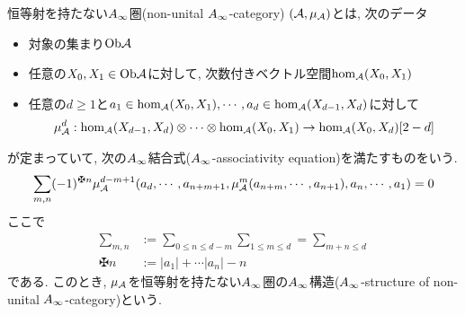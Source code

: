 \documentclass[uplatex, a4paper, 14Q, dvipdfmx]{jsarticle}
\begin{document}
\begin{definition} \label{def_non_unital_Ainf_cat}
  恒等射を持たない$A_{\infty}$圏(non-unital $A_{\infty}$-category) $(\mathcal{A},\mu_{\mathcal{A}})$とは, 次のデータ
  \begin{itemize}
    \item 対象の集まり$\mathrm{Ob}\mathcal{A}$ 
    \item 任意の$X_0, X_1 \in \mathrm{Ob}\mathcal{A}$に対して, 次数付きベクトル空間$\hom_{\mathcal{A}}(X_0,X_1)$
    \item 任意の$d \geq 1$と$a_1 \in \hom_{\mathcal{A}}(X_0,X_1), \cdots, a_d \in \hom_{\mathcal{A}}(X_{d-1},X_d)$に対して
    \begin{align*}
      \mu^d_{\mathcal{A}} : \hom_{\mathcal{A}}(X_{d-1},X_d) \otimes \cdots \otimes \hom_{\mathcal{A}}(X_0,X_1) \to \hom_{\mathcal{A}}(X_0,X_d)[2-d]
    \end{align*}
  \end{itemize}
  が定まっていて, 次の$A_{\infty}$結合式($A_{\infty}$-associativity equation)を満たすものをいう. 
  \begin{align*}
    \sum_{m,n} (-1)^{\maltese n} \mu^{d-m+1}_\A(a_d,\cdots,a_{n+m+1}, \mu^m_\A(a_{n+m},\cdots,a_{n+1}), a_n,\cdots,a_1)
    = 0
  \end{align*}
  ここで
  \begin{align*}
    \sum_{m,n} &:= \sum_{0 \leq n \leq d-m} \sum_{1 \leq m \leq d} = \sum_{m+n \leq d} \\
    \maltese n &:= |a_1| + \cdots |a_n| - n
  \end{align*}
  である. 
  このとき, $\mu_{\mathcal{A}}$を恒等射を持たない$A_{\infty}$圏の$A_{\infty}$構造($A_{\infty}$-structure of non-unital $A_{\infty}$-category)という. 
\end{definition}
\end{document}
